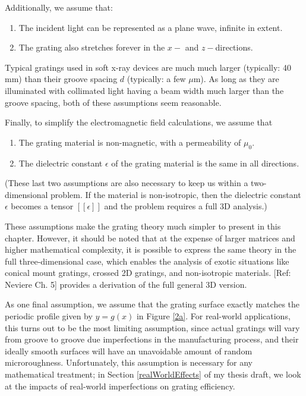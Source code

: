 Additionally, we assume that:
\begin{enumerate}
\item The incident light can be represented as a plane wave, infinite in extent.  
\item The grating also stretches forever in the $x-$ and $z-$directions.
\end{enumerate}
Typical gratings used in soft x-ray devices are much much larger (typically: 40 mm) than their groove spacing $d$ (typically: a few $\mu$m).  As long as they are illuminated with collimated light having a beam width much larger than the groove spacing, both of these assumptions seem reasonable.

Finally, to simplify the electromagnetic field calculations, we assume that
\begin{enumerate}
\item The grating material is non-magnetic, with a permeability of $\mu_0$.
\item The dielectric constant $\epsilon$ of the grating material is the same in all directions.
\end{enumerate}
(These last two assumptions are also necessary to keep us within a two-dimensional problem.  If the material is non-isotropic, then the dielectric constant $\epsilon$ becomes a tensor $\left[\left[\epsilon\right]\right]$ and the problem requires a full 3D analysis.)

These assumptions make the grating theory much simpler to present in this chapter. However, it should be noted that at the expense of larger matrices and higher mathematical complexity, it is possible to express the same theory in the full three-dimensional case, which enables the analysis of exotic situations like conical mount gratings, crossed 2D gratings, and non-isotropic materials.  [Ref: Neviere Ch. 5] provides a derivation of the full general 3D version.

As one final assumption, we assume that the grating surface exactly matches the periodic profile given by $y=g(x)$ in Figure \ref{2a}.  For real-world applications, this turns out to be the most limiting assumption, since actual gratings will vary from groove to groove due imperfections in the manufacturing process, and their ideally smooth surfaces will have an unavoidable amount of random microroughness.  Unfortunately, this assumption is necessary for any mathematical treatment; in Section \ref{realWorldEffects} of my thesis draft, we look at the impacts of real-world  imperfections on grating efficiency.


